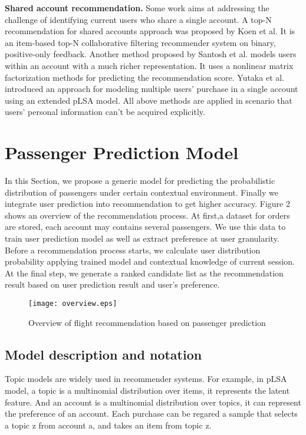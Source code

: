 \documentclass{sig-alternate-05-2015}
\begin{document}
\textbf{Shared account recommendation.} Some work aims at addressing the challenge of identifying current users who share a single account. A top-N recommendation for shared accounts approach was proposed by Koen et al.\cite{koen:top-n} It is an item-based top-N collaborative filtering recommender system on binary, positive-only feedback. Another method proposed by Santosh et al.\cite{kabbur:nlmf} models users within an account with a much richer representation. It uses a nonlinear matrix factorization methods for predicting the recommendation score. Yutaka et al.\cite{yutaka:modeling} introduced an approach for modeling multiple users' purchase in a single account using an extended pLSA model. All above methods are applied in scenario that users' personal information can't be acquired explicitly.

\section{Passenger Prediction Model}
In this Section, we propose a generic model for predicting the probabilistic distribution of passengers under certain contextual environment. Finally we integrate user prediction into recommendation to get higher accuracy. Figure 2 shows an overview of the recommendation process. At first,a dataset for orders are stored, each account may contains several passengers. We use this data to train user prediction model as well as extract preference at user granularity. Before a recommendation process starts, we calculate user distribution probability applying trained model and contextual knowledge of current session. At the final step, we generate a ranked candidate list as the recommendation result based on user prediction result and user's preference.\par
\begin{figure}[!hbt]
\centering
\texttt{[image: overview.eps]}
\caption{Overview of flight recommendation based on passenger prediction}
\label{fig:Prob}
\end{figure}\par

\subsection{Model description and notation}
Topic models are widely used in recommender systems. For example, in pLSA model\cite{tomas:coll}, a topic is a multinomial distribution over items, it represents the latent feature. And an account is a multinomial distribution over topics, it can represent the preference of an account. Each purchase can be regared a sample that selects a topic z from account a, and takes an item from topic z.\par
\end{document}
